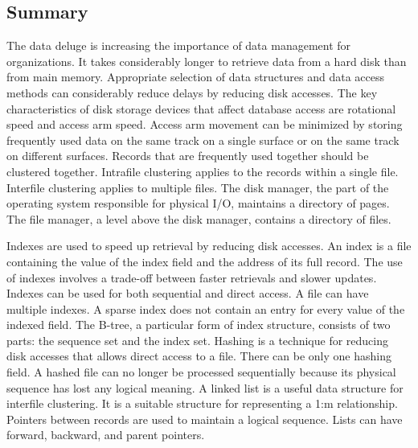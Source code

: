 \documentclass[
]{article}
\begin{document}
\hypertarget{summary-12}{%
\subsection*{Summary}\label{summary-12}}

The data deluge is increasing the importance of data management for
organizations. It takes considerably longer to retrieve data from a hard
disk than from main memory. Appropriate selection of data structures and
data access methods can considerably reduce delays by reducing disk
accesses. The key characteristics of disk storage devices that affect
database access are rotational speed and access arm speed. Access arm
movement can be minimized by storing frequently used data on the same
track on a single surface or on the same track on different surfaces.
Records that are frequently used together should be clustered together.
Intrafile clustering applies to the records within a single file.
Interfile clustering applies to multiple files. The disk manager, the
part of the operating system responsible for physical I/O, maintains a
directory of pages. The file manager, a level above the disk manager,
contains a directory of files.

Indexes are used to speed up retrieval by reducing disk accesses. An
index is a file containing the value of the index field and the address
of its full record. The use of indexes involves a trade-off between
faster retrievals and slower updates. Indexes can be used for both
sequential and direct access. A file can have multiple indexes. A sparse
index does not contain an entry for every value of the indexed field.
The B-tree, a particular form of index structure, consists of two parts:
the sequence set and the index set. Hashing is a technique for reducing
disk accesses that allows direct access to a file. There can be only one
hashing field. A hashed file can no longer be processed sequentially
because its physical sequence has lost any logical meaning. A linked
list is a useful data structure for interfile clustering. It is a
suitable structure for representing a 1:m relationship. Pointers between
records are used to maintain a logical sequence. Lists can have forward,
backward, and parent pointers.
\end{document}
